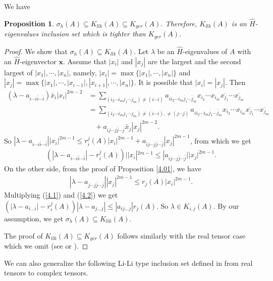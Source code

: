 \documentclass[10pt,reqno]{amsart}
\newtheorem{prop}[thm]{Proposition}
\theoremstyle{definition}
\begin{document}
We have
\begin{prop} \label{4.4}
	$\sigma_h(A)\subseteq K_{llk}(A)\subseteq K_{ger}(A)$. Therefore, $K_{llk}(A)$ is an $\hat{H}$-eigenvalues inclusion set which is tighter than $K_{ger}(A)$.
\end{prop}
\begin{proof}
We show that $\sigma_h(A)\subseteq K_{llk}(A)$. Let $\lambda$ be an $\hat{H}$-eigenvalues of $A$ with an $\hat{H}$-eigenvector $\mathbf{x}$. Assume that $|x_i|$ and $|x_j|$ are the largest and the second largest of $|x_1|,\cdots,|x_n|$, namely, $|x_i|=\max \{|x_1|,\cdots,|x_n|\}$ and $|x_j|=\max \{|x_1|,\cdots,|x_{i-1}|,|x_{i+1}|,\cdots,|x_n|\}$. It is possible that $|x_i|= |x_j|$. Then 
\begin{align*}
(\lambda-a_{i\cdots i\bar{i}\cdots\bar{i}})\bar{x}_i|x_i|^{2m-2}&=\sum_{(i_2\cdots i_mj_1\cdots j_{m})\neq (i\cdots i)} a_{ii_2\cdots i_m\bar{j}_1\cdots \bar{j}_m} x_{i_2}\cdots x_{i_m}\overline{x_{j_1}}\cdots\overline{x_{j_m}}\\
&=\sum_{(i_2\cdots i_mj_1\cdots j_{m})\neq (i\cdots i), \neq (j\cdots j)} a_{ii_2\cdots i_m\bar{j}_1\cdots \bar{j}_m} x_{i_2}\cdots x_{i_m}\overline{x_{j_1}}\cdots\overline{x_{j_m}}\\
& \ \ \ \  +a_{ij\cdots j\bar{j}\cdots\bar{j}} \bar{x}_j|x_j|^{2m-2}.\end{align*}
So $|\lambda-a_{i\cdots i\bar{i}\cdots\bar{i}}||x_i|^{2m-1}\leq r_{i}^{j}(A)|x_i|^{2m-1}+a_{ij\cdots j\bar{j}\cdots\bar{j}}|x_j|^{2m-1}$, from which we get 
\begin{align} (|\lambda -a_{i\cdots i\bar{i}\cdots\bar{i}}|-r_{i}^{j}(A))||x_i|^{2m-1}\leq |a_{ij\cdots j\bar{j}\cdots\bar{j}}| |x_j|^{2m-1}. \label{4.1}
\end{align}
On the other side, from the proof of Proposition \ref{4.01}, we have \begin{align} \label{4.2}
|\lambda-a_{j\cdots j\bar{j}\cdots\bar{j}}||x_j|^{2m-1}\leq r_{j}(A)|x_i|^{2m-1}.\end{align}
Multiplying (\ref{4.1}) and (\ref{4.2}) we get $(|\lambda -a_{i...i}|-r_{i}^{j}(A))|\lambda-a_{j...j}|\leq|a_{ij...j}|r_{j}(A)$. So $\lambda\in K_{i,j}(A)$. By our assumption, we get $\sigma_h(A)\subseteq K_{llk}(A)$.

The proof of $K_{llk}(A)\subseteq K_{ger}(A)$ follows similarly with the real tensor case which we omit (see \cite{LLK} or \cite{Q1}).
\end{proof}
We can also generalize the following Li-Li type inclusion set defined in \cite{LL} from real tensors to complex tensors.
\end{document}
